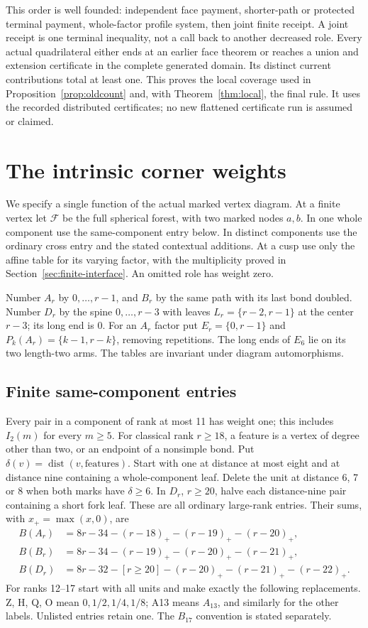 \documentclass[11pt]{article}
\theoremstyle{remark}\newtheorem{remark}[theorem]{Remark}
\begin{document}
This order is well founded: independent face payment, shorter-path
or protected terminal payment, whole-factor profile system, then
joint finite receipt. A joint receipt is one terminal inequality,
not a call back to another decreased role. Every actual quadrilateral
either ends at an earlier face theorem or reaches a union and
extension certificate in the complete generated domain. Its
distinct current contributions total at least one. This proves
the local coverage used in Proposition~\ref{prop:oldcount} and,
with Theorem~\ref{thm:local}, the final rule. It uses the recorded
distributed certificates; no new flattened certificate run is
assumed or claimed.

\section{The intrinsic corner weights}\label{app:weights}

We specify a single function of the actual marked vertex diagram.
At a finite vertex let $\mathcal F$ be the full spherical forest,
with two marked nodes $a,b$. In one whole component use the
same-component entry below. In distinct components use the ordinary
cross entry and the stated contextual additions. At a cusp use only
the affine table for its varying factor, with the multiplicity proved
in Section~\ref{sec:finite-interface}. An omitted role has weight zero.

Number $A_r$ by $0,\ldots,r-1$, and $B_r$ by the same path with
its last bond doubled. Number $D_r$ by the spine $0,\ldots,r-3$
with leaves $L_r=\{r-2,r-1\}$ at the center $r-3$; its long end is 0.
For an $A_r$ factor put $E_r=\{0,r-1\}$ and
$P_k(A_r)=\{k-1,r-k\}$, removing repetitions. The long ends of
$E_6$ lie on its two length-two arms. The tables are invariant
under diagram automorphisms.

\subsection{Finite same-component entries}
Every pair in a component of rank at most 11 has weight one;
this includes $I_2(m)$ for every $m\ge5$.
For classical rank $r\ge18$, a feature is a vertex of degree
other than two, or an endpoint of a nonsimple bond. Put
$\delta(v)=\operatorname{dist}(v,\text{features})$.
Start with one at distance at most eight and at distance nine
containing a whole-component leaf. Delete the unit at distance
6, 7 or 8 when both marks have $\delta\ge6$.
In $D_r$, $r\ge20$, halve each distance-nine pair containing a
short fork leaf. These are all ordinary large-rank entries.
Their sums, with $x_+=\max(x,0)$, are
\begin{align*}
 B(A_r)&=8r-34-(r-18)_+-(r-19)_+-(r-20)_+,\\
 B(B_r)&=8r-34-(r-19)_+-(r-20)_+-(r-21)_+,\\
 B(D_r)&=8r-32-[r\ge20]-(r-20)_+-(r-21)_+-(r-22)_+.
\end{align*}
For ranks 12--17 start with all units and make exactly the following
replacements. Z, H, Q, O mean $0,1/2,1/4,1/8$; A13 means
$A_{13}$, and similarly for the other labels. Unlisted entries
retain one. The $B_{17}$ convention is stated separately.
\end{document}
